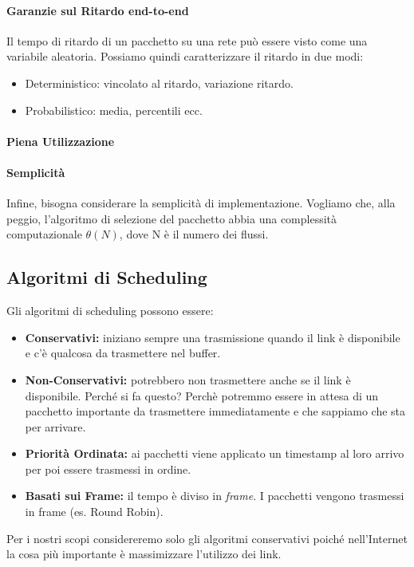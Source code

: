 \documentclass{article}
\begin{document}
\paragraph{Garanzie sul Ritardo end-to-end} Il tempo di ritardo di un pacchetto su una rete può essere visto come una variabile aleatoria. Possiamo quindi caratterizzare il ritardo in due modi:
\begin{itemize}
    \item Deterministico: vincolato al ritardo, variazione ritardo.
    \item Probabilistico: media, percentili ecc.
\end{itemize}

\paragraph{Piena Utilizzazione}
\paragraph{Semplicità} Infine, bisogna considerare la semplicità di implementazione. Vogliamo che, alla peggio, l'algoritmo di selezione del pacchetto abbia una complessità computazionale \(\displaystyle\theta(N)\), dove N è il numero dei flussi.

\newpage
\subsection{Algoritmi di Scheduling}
Gli algoritmi di scheduling possono essere:
\begin{itemize}
    \item \textbf{Conservativi: } iniziano sempre una trasmissione quando il link è disponibile e c'è qualcosa da trasmettere nel buffer.
    \item \textbf{Non-Conservativi: } potrebbero non trasmettere anche se il link è disponibile. Perché si fa questo? Perchè potremmo essere in attesa di un pacchetto importante da trasmettere immediatamente e che sappiamo che sta per arrivare.
    \item \textbf{Priorità Ordinata: } ai pacchetti viene applicato un timestamp al loro arrivo per poi essere trasmessi in ordine.
    \item \textbf{Basati sui Frame: } il tempo è diviso in \textit{frame}. I pacchetti vengono trasmessi in frame (es. Round Robin).
\end{itemize}
Per i nostri scopi considereremo solo gli algoritmi conservativi poiché nell'Internet la cosa più importante è massimizzare l'utilizzo dei link.
\end{document}
